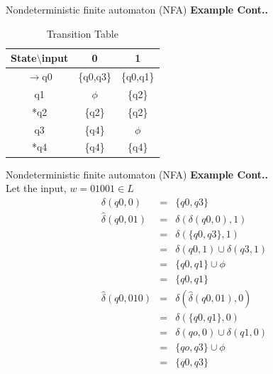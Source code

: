 \documentclass{beamer}
\begin{document}
\begin{frame}{Nondeterministic finite automaton (NFA)}
	\textbf{Example Cont..}\\
	\begin{center}
		\begin{table}
			\begin{tabular}{ c ||c |c }
				
				State$\setminus$input & 0 & 1 \\ 
				\hline
				\hline
				$\rightarrow$q0 & \{q0,q3\} & \{q0,q1\} \\  
				\hline
				q1 & $\phi$& \{q2\}    \\
					\hline
				*q2 & \{q2\} & \{q2\}    \\
					\hline
				q3 & \{q4\} & $\phi$    \\
					\hline
				*q4 & \{q4\} & \{q4\}   \\				
			\end{tabular}
			\caption{Transition Table}
		\end{table}
	\end{center}
\end{frame}
\begin{frame}{Nondeterministic finite automaton (NFA)}
	\textbf{Example Cont..}\\
	Let the input, $w = 01001 \in L$
	\begin{eqnarray*}
		\delta(q0,0)&=&\{q0,q3\}\\
		\hat{\delta}(q0,01)&=&\delta(\delta(q0,0),1)\\
						&=&\delta(\{q0,q3\},1)\\
						&=&\delta(q0,1)\cup \delta(q3,1)\\
						&=&\{q0,q1\} \cup \phi\\
						&=&\{q0,q1\}\\
		\hat{\delta}(q0,010)&=&\delta(\hat{\delta}(q0,01),0)\\
						&=&\delta(\{q0,q1\},0)\\
						&=&\delta(qo,0) \cup \delta(q1,0)\\
						&=&\{qo,q3\}\cup \phi\\
						&=&\{q0,q3\}\\
	\end{eqnarray*}
\end{frame}
\end{document}

